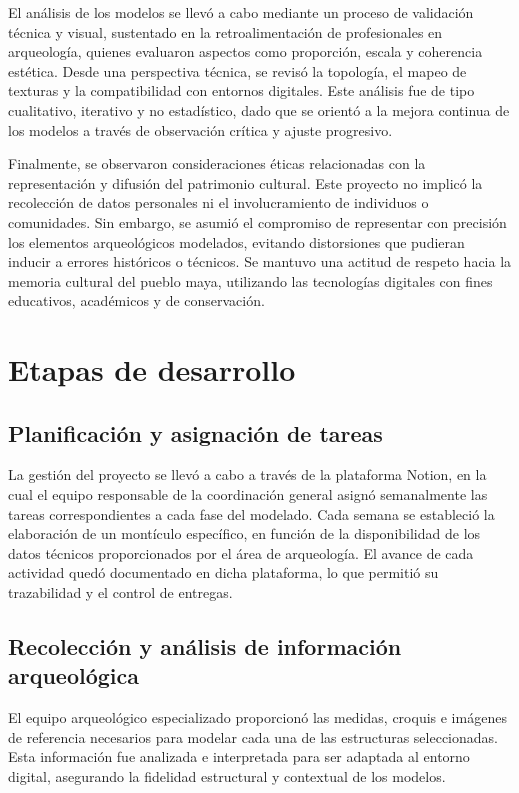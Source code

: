 El análisis de los modelos se llevó a cabo mediante un proceso de validación técnica y visual, sustentado en la retroalimentación de profesionales en arqueología, quienes evaluaron aspectos como proporción, escala y coherencia estética. Desde una perspectiva técnica, se revisó la topología, el mapeo de texturas y la compatibilidad con entornos digitales. Este análisis fue de tipo cualitativo, iterativo y no estadístico, dado que se orientó a la mejora continua de los modelos a través de observación crítica y ajuste progresivo.

Finalmente, se observaron consideraciones éticas relacionadas con la representación y difusión del patrimonio cultural. Este proyecto no implicó la recolección de datos personales ni el involucramiento de individuos o comunidades. Sin embargo, se asumió el compromiso de representar con precisión los elementos arqueológicos modelados, evitando distorsiones que pudieran inducir a errores históricos o técnicos. Se mantuvo una actitud de respeto hacia la memoria cultural del pueblo maya, utilizando las tecnologías digitales con fines educativos, académicos y de conservación.

\section{Etapas de desarrollo}
\subsection{Planificación y asignación de tareas}
La gestión del proyecto se llevó a cabo a través de la plataforma Notion, en la cual el equipo responsable de la coordinación general asignó semanalmente las tareas correspondientes a cada fase del modelado. Cada semana se estableció la elaboración de un montículo específico, en función de la disponibilidad de los datos técnicos proporcionados por el área de arqueología. El avance de cada actividad quedó documentado en dicha plataforma, lo que permitió su trazabilidad y el control de entregas.

\subsection{Recolección y análisis de información arqueológica}
El equipo arqueológico especializado proporcionó las medidas, croquis e imágenes de referencia necesarios para modelar cada una de las estructuras seleccionadas. Esta información fue analizada e interpretada para ser adaptada al entorno digital, asegurando la fidelidad estructural y contextual de los modelos.

